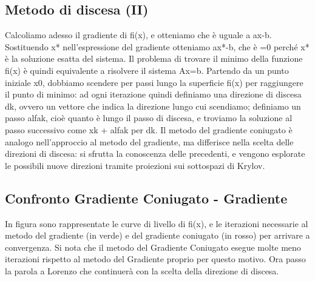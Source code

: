 \documentclass[a4paper]{article}
\begin{document}
\subsection*{Metodo di discesa (II)}
Calcoliamo adesso il gradiente di fi(x), e otteniamo che è uguale a ax-b. Sostituendo x* nell’espressione del gradiente otteniamo ax*-b, che è =0 perché x* è la soluzione esatta del sistema. Il problema di trovare il minimo della funzione fi(x) è quindi equivalente a risolvere il sistema Ax=b.
Partendo da un punto iniziale x0, dobbiamo scendere per passi lungo la superficie fi(x) per raggiungere il punto di minimo: ad ogni iterazione quindi definiamo una direzione di discesa dk, ovvero un vettore che indica la direzione lungo cui scendiamo; definiamo un passo alfak, cioè quanto è lungo il passo di discesa, e troviamo la soluzione al passo successivo come xk + alfak per dk.
Il metodo del gradiente coniugato è analogo nell'approccio al metodo del gradiente, ma differisce nella scelta delle direzioni di discesa: si sfrutta la conoscenza delle precedenti, e vengono esplorate le possibili nuove direzioni tramite proiezioni sui sottospazi di Krylov.

\subsection*{Confronto Gradiente Coniugato - Gradiente}
In figura sono rappresentate le curve di livello di fi(x), e le iterazioni necessarie al metodo del gradiente (in verde) e del gradiente coniugato (in rosso) per arrivare a convergenza.
Si nota che il metodo del Gradiente Coniugato esegue molte meno iterazioni rispetto al metodo del Gradiente proprio per questo motivo. 
Ora passo la parola a Lorenzo che continuerà con la scelta della direzione di discesa.


\end{document}
